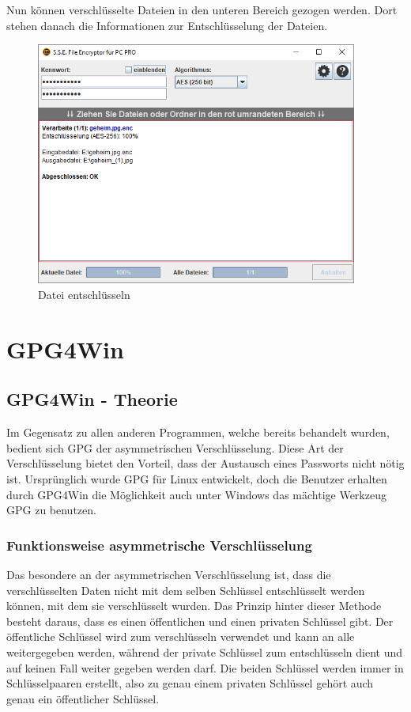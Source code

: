 \documentclass[12pt,a4paper]{scrreprt}
\begin{document}
\noindent Nun können verschlüsselte Dateien in den unteren Bereich gezogen werden. Dort stehen danach die Informationen zur Entschlüsselung der Dateien.

\begin{figure}[h]
\begin{center}
\includegraphics[width=300pt]{media/sse3.png}
\caption{Datei entschlüsseln}
\label{sse3}
\end{center}
\end{figure}


\part{GPG4Win}

\chapter{GPG4Win - Theorie}
Im Gegensatz zu allen anderen Programmen, welche bereits behandelt wurden, bedient sich GPG der asymmetrischen Verschlüsselung. Diese Art der Verschlüsselung bietet den Vorteil, dass der Austausch eines Passworts nicht nötig ist. Ursprünglich wurde GPG für Linux entwickelt, doch die Benutzer erhalten durch GPG4Win die Möglichkeit auch unter Windows das mächtige Werkzeug GPG zu benutzen.

\section{Funktionsweise asymmetrische Verschlüsselung}
Das besondere an der asymmetrischen Verschlüsselung ist, dass die verschlüsselten Daten nicht mit dem selben Schlüssel entschlüsselt werden können, mit dem sie verschlüsselt wurden. Das Prinzip hinter dieser Methode besteht daraus, dass es einen öffentlichen und einen privaten Schlüssel gibt. Der öffentliche Schlüssel wird zum verschlüsseln verwendet und kann an alle weitergegeben werden, während der private Schlüssel zum entschlüsseln dient und auf keinen Fall weiter gegeben werden darf. Die beiden Schlüssel werden immer in Schlüsselpaaren erstellt, also zu genau einem privaten Schlüssel gehört auch genau ein öffentlicher Schlüssel.\\
\end{document}
